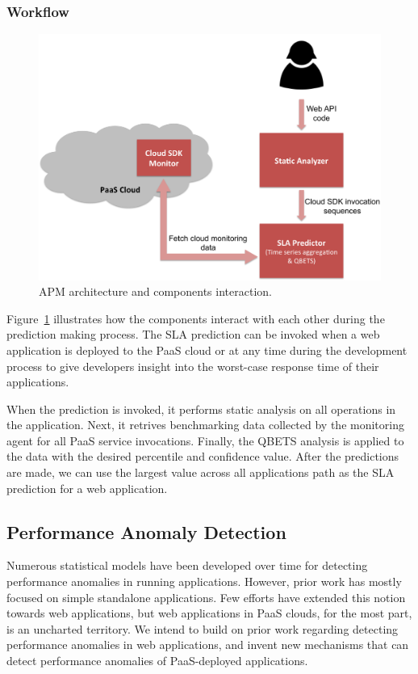 \documentclass[11pt]{article}
\begin{document}
\subsubsection{Workflow}
\begin{figure}
\centering
\includegraphics[scale=0.35]{apm_flow}
\caption{APM architecture and components interaction.}
\label{fig:apm_flow}
\end{figure}
Figure~\ref{fig:apm_flow} illustrates how the components interact with each other during the prediction making process.
The SLA prediction can be invoked when a web application is deployed to the PaaS cloud or at any time during the development process to give
developers insight into the worst-case response time of their applications.

When the prediction is invoked, it performs static analysis on all operations in the application. Next, it retrives benchmarking data collected by
the monitoring agent for all PaaS service invocations. Finally, the QBETS analysis is applied to the data with the desired percentile and confidence value.
After the predictions are made, we can use the largest value across all applications path as the SLA prediction for a web application.

\subsection{Performance Anomaly Detection}
Numerous statistical models have been developed over time for detecting performance anomalies in running
applications. However, prior work has mostly focused on simple standalone applications. Few efforts have
extended this notion towards web applications, but web applications in PaaS clouds, for the most part,
is an uncharted territory. We intend to build on prior work regarding detecting performance anomalies in
web applications, and invent new mechanisms that can detect performance anomalies of PaaS-deployed
applications.
\end{document}
